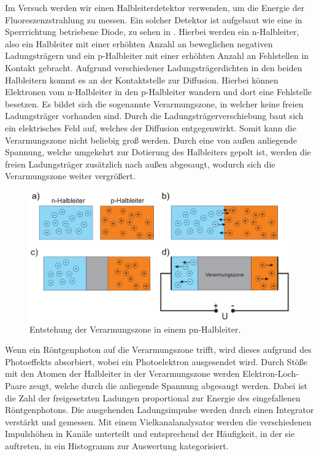 Im Versuch werden wir einen Halbleiterdetektor verwenden, um die Energie der Fluoreszenzstrahlung zu messen. Ein solcher Detektor ist aufgebaut wie eine in Sperrrichtung betriebene Diode, zu sehen in . 
Hierbei werden ein n-Halbleiter, also ein Halbleiter mit einer erhöhten Anzahl an beweglichen negativen Ladungsträgern und ein p-Halbleiter mit einer erhöhten Anzahl an Fehlstellen in Kontakt gebracht. Aufgrund verschiedener Ladungsträgerdichten in den beiden Halbleitern kommt es an der Kontaktstelle zur Diffusion. Hierbei können Elektronen vom n-Halbleiter in den p-Halbleiter wandern und dort eine Fehlstelle besetzen. Es bildet sich die sogenannte Verarmungszone, in welcher keine freien Ladungsträger vorhanden sind. Durch die Ladungsträgerverschiebung baut sich ein elektrisches Feld auf, welches der Diffusion entgegenwirkt. Somit kann die Verarmungszone nicht beliebig groß werden. Durch eine von außen anliegende Spannung, welche umgekehrt zur Dotierung des Halbleiters gepolt ist, werden die freien Ladungsträger zusätzlich nach außen abgesaugt, wodurch sich die Verarmungszone weiter vergrößert. 

\begin{figure}[H]
  \centering
  \includegraphics[width=.75\textwidth]{files/pn_halbleiter.png}
  \caption{Entstehung der Verarmungszone in einem pn-Halbleiter.}
  \label{fig:pn_halbleiter}
\end{figure}


Wenn ein Röntgenphoton auf die Verarmungszone trifft, wird dieses aufgrund des Photoeffekts absorbiert, wobei ein Photoelektron ausgesendet wird. Durch Stöße mit den Atomen der Halbleiter in der Verarmungszone werden Elektron-Loch-Paare zeugt, welche durch die anliegende Spannung abgesaugt werden. Dabei ist die Zahl der freigesetzten Ladungen proportional zur Energie des eingefallenen Röntgenphotons. Die ausgehenden Ladungsimpulse werden durch einen Integrator verstärkt und gemessen. Mit einem Vielkanalanalysator werden die verschiedenen Impulshöhen in Kanäle unterteilt und entsprechend der Häufigkeit, in der sie auftreten, in ein Histogramm zur Auswertung kategorisiert.

